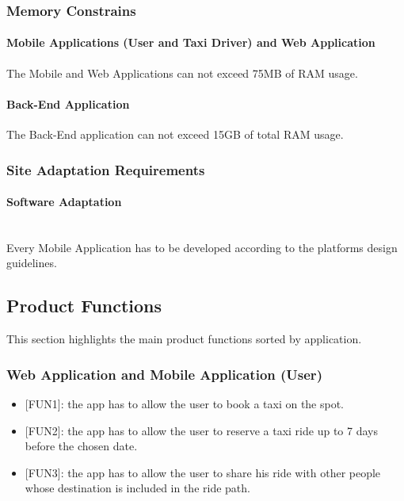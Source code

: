 \documentclass[12pt, a4paper]{article}
\begin{document}
\subsubsection{Memory Constrains} %

\label{ssub:memory_constrains}
\paragraph{Mobile Applications (User and Taxi Driver) and Web Application}
The Mobile and Web Applications can not exceed 75MB of RAM usage.
\paragraph{Back-End Application}
The Back-End application can not exceed 15GB of total RAM usage.

\subsubsection{Site Adaptation Requirements} %
\label{ssub:site_adaptation_requirements}
\paragraph{Software Adaptation} \mbox{} \\
Every Mobile Application has to be developed according to the platforms design guidelines.

\subsection{Product Functions} %
\label{sub:product_functions}
This section highlights the main product functions sorted by application.

\subsubsection{Web Application and Mobile Application (User)}
\label{ssub:web_application_and_mobile_application_}
\begin{itemize}
	\item {[FUN1\label{itm:FUN1}]}: the app has to allow the user to book a taxi on the spot.
	\item {[FUN2\label{itm:FUN2}]}: the app has to allow the user to reserve a taxi ride up to 7 days before the chosen date.
	\item {[FUN3\label{itm:FUN3}]}: the app has to allow the user to share his ride with other people whose destination is included in the ride path.
\end{itemize}
\end{document}
